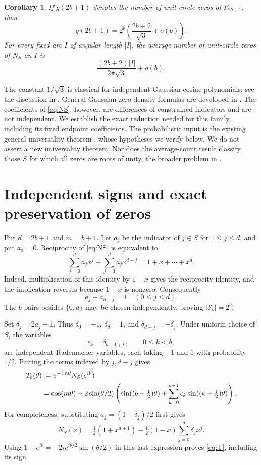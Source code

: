 \documentclass[11pt]{article}
\newtheorem{corollary}[theorem]{Corollary}
\begin{document}
\begin{corollary}\label{cor:product}
If $g(2b+1)$ denotes the number of unit-circle zeros of $F_{2b+1}$, then
\[
 g(2b+1)=2^b\left(\frac{2b+2}{\sqrt3}+o(b)\right).
\]
For every fixed arc $I$ of angular length $|I|$, the average number of
unit-circle zeros of $N_S$ on $I$ is
\[
 \frac{(2b+2)|I|}{2\pi\sqrt3}+o(b).
\]
\end{corollary}

The constant $1/\sqrt3$ is classical for independent Gaussian cosine
polynomials; see the discussion in \cite{CFI}. General Gaussian
zero-density formulas are developed in \cite{EK}. The coefficients of
\eqref{eq:NS}, however, are differences of constrained indicators and
are not independent. We establish the exact reduction needed for this
family, including its fixed endpoint coefficients. The probabilistic input
is the existing general universality theorem \cite[Theorem 2.6]{NV},
whose hypotheses we verify below. We do not assert a new universality
theorem. Nor does the average-count result classify those $S$ for which
all zeros are roots of unity, the broader problem in \cite{StanleyECA}.

\section{Independent signs and exact preservation of zeros}
Put $d=2b+1$ and $m=b+1$. Let $a_j$ be the indicator of $j\in S$ for
$1\le j\le d$, and put $a_0=0$. Reciprocity of \eqref{eq:NS} is
equivalent to
\[
 \sum_{j=0}^d a_jx^j+\sum_{j=0}^d a_jx^{d-j}
 =1+x+\cdots+x^d.
\]
Indeed, multiplication of this identity by $1-x$ gives the reciprocity
identity, and the implication reverses because $1-x$ is nonzero.
Consequently
\begin{equation}\label{eq:complement}
 a_j+a_{d-j}=1\quad(0\le j\le d).
\end{equation}
The $b$ pairs besides $\{0,d\}$ may be chosen independently, proving
$|\mathcal S_b|=2^b$.

Set $\delta_j=2a_j-1$. Thus $\delta_0=-1$, $\delta_d=1$, and
$\delta_{d-j}=-\delta_j$. Under uniform choice of $S$, the variables
\[
 \epsilon_k=\delta_{b+1+k},\qquad 0\le k<b,
\]
are independent Rademacher variables, each taking $-1$ and $1$ with
probability $1/2$. Pairing the terms indexed by $j,d-j$ gives
\begin{align}
 T_b(\theta)&:=e^{-im\theta}N_S(e^{i\theta})\notag\\
 &=\cos(m\theta)-2\sin(\theta/2)
 \left(\sin((b+\tfrac12)\theta)
   +\sum_{k=0}^{b-1}\epsilon_k\sin((k+\tfrac12)\theta)\right).
 \label{eq:T}
\end{align}
For completeness, substituting $a_j=(1+\delta_j)/2$ first gives
\[
 N_S(x)=\tfrac12(1+x^{d+1})-\tfrac12(1-x)\sum_{j=0}^d\delta_jx^j.
\]
Using $1-e^{i\theta}=-2ie^{i\theta/2}\sin(\theta/2)$ in this last
expression proves \eqref{eq:T}, including its sign.
\end{document}

